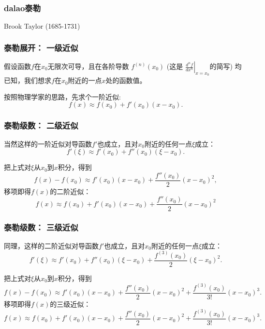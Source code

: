 \documentclass[CJK,13pt]{beamer}
\date{}
\begin{document}
  \bch



\begin{frame}
  \frametitle{dalao泰勒}
  
  \bcenter

  Brook Taylor (1685-1731)
  \ecenter
  
\end{frame}

\begin{frame}
  \frametitle{泰勒展开： 一级近似}
  
  假设函数$f$在$x_0$无限次可导，且在各阶导数  $f^{(n)}(x_0)$ (这是 $\left.\frac{d^nf}{dx^n}\right\vert_{x=x_0}$的简写) 均已知，我们想求$f$在$x_0$附近的一点$x$处的函数值。


  \skiplines
  
  按照物理学家的思路，先求个一阶近似:
  \begin{equation}
    f(x) \approx f(x_0) + f'(x_0)(x-x_0). \nonumber
  \end{equation}
  
  
\end{frame}

\begin{frame}
  \frametitle{泰勒级数： 二级近似}
  
  当然这样的一阶近似对导函数$f'$也成立，且对$x_0$附近的任何一点$\xi$成立：
$$    f'(\xi) \approx f'(x_0) + f''(x_0)(\xi-x_0).  $$

  把上式对$\xi$从$x_0$到$x$积分，得到
  $$     f(x) - f(x_0) \approx f'(x_0)(x-x_0) + \frac{f''(x_0)}{2} (x-x_0)^2 ,$$
  移项即得$f(x)$的二阶近似：
  \begin{equation}
    f(x) \approx f(x_0)  + f'(x_0)(x-x_0) + \frac{f''(x_0)}{2} (x-x_0)^2 \nonumber
  \end{equation}
  
  
\end{frame}


\begin{frame}
  \frametitle{泰勒级数： 三级近似}
  
  同理，这样的二阶近似对导函数$f'$也成立，且对$x_0$附近的任何一点$\xi$成立：
$$    f'(\xi) \approx f'(x_0) + f''(x_0)(\xi-x_0) + \frac{f^{(3)}(x_0)}{2} (\xi - x_0)^2.  $$

  把上式对$\xi$从$x_0$到$x$积分，得到
  $$     f(x) - f(x_0)  \approx  f'(x_0)(x-x_0) + \frac{f''(x_0)}{2} (x-x_0)^2 + \frac{f^{(3)}(x_0)}{3!}(x-x_0)^3. $$
  移项即得$f(x)$的三级近似：
  \begin{equation}
    f(x)  \approx f(x_0) + f'(x_0)(x-x_0) + \frac{f''(x_0)}{2} (x-x_0)^2 + \frac{f^{(3)}(x_0)}{3!}(x-x_0)^3. \nonumber
  \end{equation}
  
  
\end{frame}
\end{document}
